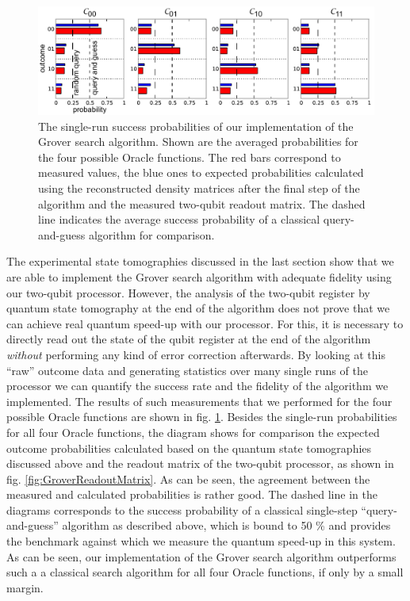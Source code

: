 \begin{figure}[ht!]
	\centering
		\includegraphics[width=1.\textwidth]{"./data/ct5/2011_04_21 - grover and tomo/good_data/grover algorithm - single run probabilities"}
		\caption[Single-run success probabilities of the Grover search algorithm]{The single-run success probabilities of our implementation of the Grover search algorithm. Shown are the averaged probabilities for the four possible Oracle functions. The red bars correspond to measured values, the blue ones to expected probabilities calculated using the reconstructed density matrices after the final step of the algorithm and the measured two-qubit readout matrix. The dashed line indicates the average success probability of a classical query-and-guess algorithm for comparison.}
	\label{fig:GroverSingleShotResults}
\end{figure}
The experimental state tomographies discussed in the last section show that we are able to implement the Grover search algorithm with adequate fidelity using our two-qubit processor. However, the analysis of the two-qubit register by quantum state tomography at the end of the algorithm does not prove that we can achieve real quantum speed-up with our processor. For this, it is necessary to directly read out the state of the qubit register at the end of the algorithm {\it without} performing any kind of error correction afterwards. By looking at this ``raw'' outcome data and generating statistics over many single runs of the processor we can quantify the success rate and the fidelity of the algorithm we implemented. The results of such measurements that we performed for the four possible Oracle functions are shown in fig. \ref{fig:GroverSingleShotResults}. Besides the single-run probabilities for all four Oracle functions, the diagram shows for comparison the expected outcome probabilities calculated based on the quantum state tomographies discussed above and the readout matrix of the two-qubit processor, as shown in fig. \ref{fig:GroverReadoutMatrix}. As can be seen, the agreement between the measured and calculated probabilities is rather good. The dashed line in the diagrams corresponds to the success probability of a classical single-step ``query-and-guess'' algorithm as described above, which is bound to 50 \% and provides the benchmark against which we measure the quantum speed-up in this system. As can be seen, our implementation of the Grover search algorithm outperforms such a a classical search algorithm for all four Oracle functions, if only by a small margin.


